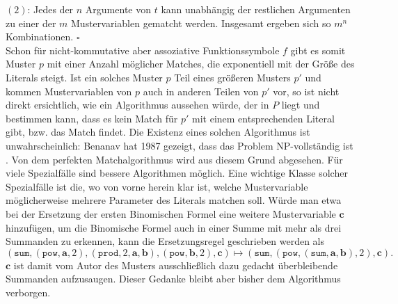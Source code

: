 $(2)$: Jedes der $n$ Argumente von $t$ kann unabhängig der restlichen Argumenten zu einer der $m$ Mustervariablen gematcht werden. Insgesamt ergeben sich so $m^n$ Kombinationen.
\hfill $\square$\\

Schon für nicht-kommutative aber assoziative Funktionssymbole $f$ gibt es somit Muster $p$ mit einer Anzahl möglicher Matches, die exponentiell mit der Größe des Literals steigt. Ist ein solches Muster $p$ Teil eines größeren Musters $p'$ und kommen Mustervariablen von $p$ auch in anderen Teilen von $p'$ vor, so ist nicht direkt ersichtlich, wie ein Algorithmus aussehen würde, der in $P$ liegt und bestimmen kann, dass es kein Match für $p'$ mit einem entsprechenden Literal gibt, bzw. das Match findet. Die Existenz eines solchen Algorithmus ist unwahrscheinlich: Benanav hat 1987 gezeigt, dass das Problem NP-vollständig ist \cite{NPHardMatching}.
Von dem perfekten Matchalgorithmus wird aus diesem Grund abgesehen. Für viele Spezialfälle sind bessere Algorithmen möglich. Eine wichtige Klasse solcher Spezialfälle ist die, wo von vorne herein klar ist, welche Mustervariable möglicherweise mehrere Parameter des Literals matchen soll. Würde man etwa bei der Ersetzung der ersten Binomischen Formel eine weitere Mustervariable $\mathbf c$ hinzufügen, um die Binomische Formel auch in einer Summe mit mehr als drei Summanden zu erkennen, kann die Ersetzungsregel geschrieben werden als
$$(\texttt{sum}, (\texttt{pow}, \mathbf a, 2), (\texttt{prod}, 2, \mathbf a, \mathbf b), (\texttt{pow}, \mathbf b, 2), \mathbf c) \mapsto (\texttt{sum}, (\texttt{pow}, (\texttt{sum}, \mathbf a, \mathbf b), 2), \mathbf c).$$
$\mathbf c$ ist damit vom Autor des Musters ausschließlich dazu gedacht überbleibende Summanden \glqq aufzusaugen\grqq{}. Dieser Gedanke bleibt aber bisher dem Algorithmus verborgen.
